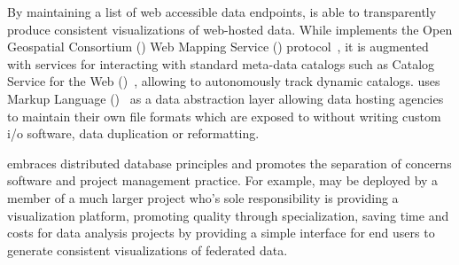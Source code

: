 
By maintaining a list of web accessible data endpoints, \sciwms{} is
able to transparently produce consistent visualizations of web-hosted
data. While \sciwms{} implements the Open Geospatial Consortium (\ogc{})
Web Mapping Service (\wms{}) protocol~\cite{wms14}, it is augmented
with services for interacting with standard meta-data catalogs such as
Catalog Service for the Web (\csw{})~\cite{csw14}, allowing \sciwms{}
to autonomously track dynamic catalogs. \sciwms{} uses \netcdf{}
Markup Language (\ncml{})~\cite{ncml06} as a data abstraction layer
allowing data hosting agencies to maintain their own file formats
which are exposed to \sciwms{} without writing custom i/o software,
data duplication or reformatting.

\sciwms{} embraces distributed database principles and promotes the
separation of concerns software and project management practice. For
example, \sciwms{} may be deployed by a member of a much larger
project who's sole responsibility is providing a visualization
platform, promoting quality through specialization, saving time and
costs for data analysis projects by providing a simple interface for
end users to generate consistent visualizations of federated data.
